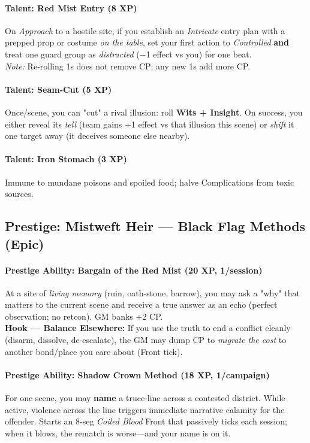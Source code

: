 \paragraph{Talent: Red Mist Entry (8 XP)}
On \emph{Approach} to a hostile site, if you establish an \emph{Intricate} entry plan with a prepped prop or costume \emph{on the table}, set your first action to \emph{Controlled} \textbf{and} treat one guard group as \emph{distracted} (−1 effect vs you) for one beat. \\
\emph{Note:} Re-rolling 1s does not remove CP; any new 1s add more CP.

\paragraph{Talent: Seam-Cut (5 XP)}
Once/scene, you can "cut" a rival illusion: roll \textbf{Wits + Insight}. On success, you either reveal its \emph{tell} (team gains +1 effect vs that illusion this scene) or \emph{shift} it one target away (it deceives someone else nearby).

\paragraph{Talent: Iron Stomach (3 XP)}
Immune to mundane poisons and spoiled food; halve Complications from toxic sources.

\subsection{Prestige: Mistweft Heir — Black Flag Methods (Epic)}
\paragraph{Prestige Ability: Bargain of the Red Mist (20 XP, 1/session)}
At a site of \emph{living memory} (ruin, oath-stone, barrow), you may ask a "why" that matters to the current scene and receive a true answer as an echo (perfect observation; no retcon). GM banks +2 CP. \\
\textbf{Hook — Balance Elsewhere:} If you use the truth to end a conflict cleanly (disarm, dissolve, de-escalate), the GM may dump CP to \emph{migrate the cost} to another bond/place you care about (Front tick).

\paragraph{Prestige Ability: Shadow Crown Method (18 XP, 1/campaign)}
For one scene, you may \textbf{name} a truce-line across a contested district. While active, violence across the line triggers immediate narrative calamity for the offender. Starts an 8-seg \emph{Coiled Blood} Front that passively ticks each session; when it blows, the rematch is worse—and your name is on it.

